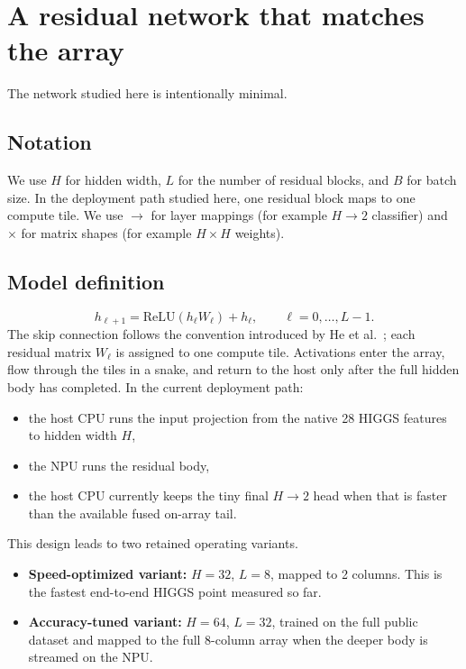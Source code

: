 \documentclass[a4paper,11pt]{article}
\begin{document}
\section{A residual network that matches the array}

The network studied here is intentionally minimal.

\subsection*{Notation}

We use $H$ for hidden width, $L$ for the number of residual blocks, and $B$ for
batch size. In the deployment path studied here, one residual block maps to one
compute tile. We use $\rightarrow$ for layer mappings (for example
$H \rightarrow 2$ classifier) and $\times$ for matrix shapes (for example
$H \times H$ weights).

\subsection*{Model definition}

\[
  h_{\ell+1} = \mathrm{ReLU}(h_{\ell} W_{\ell}) + h_{\ell},
  \qquad \ell = 0,\dots,L-1.
\]
The skip connection follows the convention introduced by He et al.~\cite{he-resnet};
each residual matrix $W_{\ell}$ is assigned to one compute tile. Activations
enter the array, flow through the tiles in a snake, and return to the host only
after the full hidden body has completed. In the current deployment path:
\begin{itemize}
  \item the host CPU runs the input projection from the native 28 HIGGS features
         to hidden width $H$,
  \item the NPU runs the residual body,
  \item the host CPU currently keeps the tiny final $H \rightarrow 2$ head when
         that is faster than the available fused on-array tail.
\end{itemize}

This design leads to two retained operating variants.
\begin{itemize}
  \item \textbf{Speed-optimized variant:} $H=32$, $L=8$, mapped to 2 columns. This is
         the fastest end-to-end HIGGS point measured so far.
  \item \textbf{Accuracy-tuned variant:} $H=64$, $L=32$, trained on the full public
         dataset and mapped to the full 8-column array when the deeper body is
         streamed on the NPU.
\end{itemize}
\end{document}
